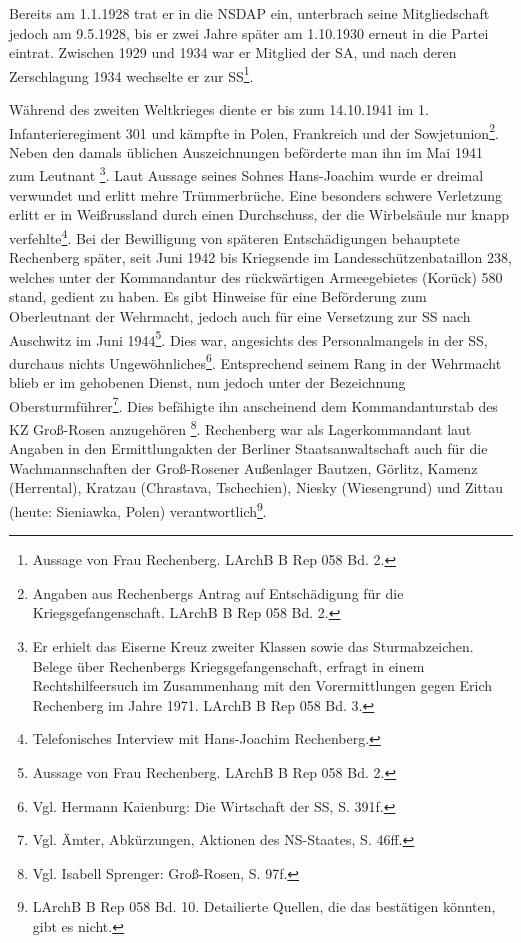 \documentclass[a4paper,12pt,ngerman,
]{nisebook}
\begin{document}
Bereits am 1.1.1928 trat er in die NSDAP ein, unterbrach seine Mitgliedschaft jedoch am 9.5.1928, bis  er zwei Jahre später am 1.10.1930 erneut in die Partei eintrat. Zwischen 1929 und 1934 war er Mitglied der SA, und nach deren Zerschlagung 1934 wechselte er zur SS\footnote{Aussage von Frau Rechenberg. LArchB B Rep 058 Bd. 2.}.

Während des zweiten Weltkrieges diente er bis zum 14.10.1941 im 1. Infanterieregiment 301 und kämpfte in Polen, Frankreich und der Sowjetunion\footnote{Angaben aus Rechenbergs Antrag auf Entschädigung für die Kriegsgefangenschaft. LArchB B Rep 058 Bd. 2.}. Neben den damals üblichen Auszeichnungen beförderte man ihn im Mai 1941 zum Leutnant
\footnote{Er erhielt das Eiserne Kreuz zweiter Klassen sowie das Sturmabzeichen. Belege über Rechenbergs Kriegsgefangenschaft, erfragt in einem Rechtshilfeersuch im Zusammenhang mit den Vorermittlungen gegen Erich Rechenberg im Jahre 1971. LArchB B Rep 058 Bd. 3.}.
Laut Aussage seines Sohnes Hans-Joachim wurde er dreimal verwundet und erlitt mehre Trümmerbrüche. Eine besonders schwere Verletzung erlitt er in Weißrussland durch einen Durchschuss, der die Wirbelsäule nur knapp verfehlte\footnote{Telefonisches Interview mit Hans-Joachim Rechenberg.}. Bei der Bewilligung von späteren Entschädigungen behauptete Rechenberg später, seit Juni 1942 bis Kriegsende im Landesschützenbataillon 238, welches unter der Kommandantur des rückwärtigen Armeegebietes (Korück) 580 stand, gedient zu haben.
Es gibt Hinweise für eine Beförderung zum Oberleutnant der Wehrmacht, jedoch auch für eine Versetzung zur SS nach Auschwitz im Juni 1944\footnote{Aussage von Frau Rechenberg. LArchB B Rep 058 Bd. 2.}. Dies war, angesichts des Personalmangels in der SS, durchaus nichts Ungewöhnliches\footnote{Vgl. Hermann Kaienburg: Die Wirtschaft der SS, S. 391f.}.
Entsprechend seinem Rang in der Wehrmacht blieb er im gehobenen Dienst, nun jedoch unter der Bezeichnung Obersturmführer\footnote{Vgl. Ämter, Abkürzungen, Aktionen des NS-Staates, S. 46ff.}.
Dies befähigte ihn anscheinend dem Kommandanturstab des KZ Groß-Rosen anzugehören
\footnote{Vgl. Isabell Sprenger: Groß-Rosen, S. 97f.}. Rechenberg war als Lagerkommandant laut Angaben in den Ermittlungakten der Berliner Staatsanwaltschaft auch für die Wachmannschaften der Groß-Rosener Außenlager Bautzen, Görlitz, Kamenz (Herrental), Kratzau (Chrastava, Tschechien), Niesky (Wiesengrund) und Zittau (heute: Sieniawka, Polen) verantwortlich\footnote{LArchB B Rep 058 Bd. 10. Detailierte Quellen, die das bestätigen könnten, gibt es nicht.}.
\end{document}
